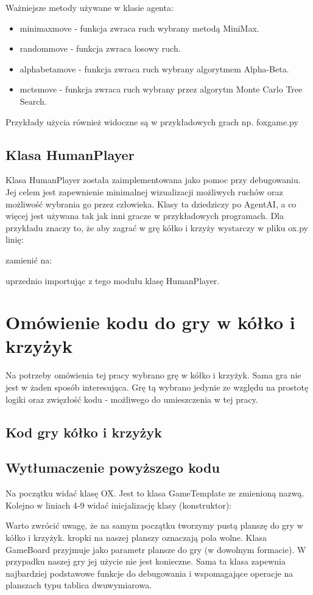 \documentclass[polish,shortabstract,inz]{iithesis}
\begin{document}
Ważniejsze metody używane w klasie agenta:
\begin{itemize}
  \item minimax\textunderscore move - funkcja zwraca ruch wybrany metodą MiniMax.
  \item random\textunderscore move - funkcja zwraca losowy ruch.
  \item alpha\textunderscore beta\textunderscore move - funkcja zwraca ruch wybrany algorytmem Alpha-Beta.
  \item mcts\textunderscore move - funkcja zwraca ruch wybrany przez algorytm Monte Carlo Tree Search.
\end{itemize}
Przykłady użycia również widoczne są w przykładowych grach np. fox\textunderscore game.py

\subsection{Klasa HumanPlayer}
Klasa HumanPlayer została zaimplementowana jako pomoc przy debugowaniu.
Jej celem jest zapewnienie minimalnej wizualizacji możliwych ruchów oraz możliwość wybrania go przez człowieka.
Klasy ta dziedziczy po AgentAI, a co więcej jest używana tak jak inni gracze w przykładowych programach.
Dla przykładu znaczy to, że aby zagrać w grę kółko i krzyży wystarczy w pliku ox.py linię:

zamienić na:

uprzednio importując z tego modułu klasę HumanPlayer.

\section{Omówienie kodu do gry w kółko i krzyżyk}
Na potrzeby omówienia tej pracy wybrano grę w kółko i krzyżyk.
Sama gra nie jest w żaden sposób interesująca.
Grę tą wybrano jedynie ze względu na prostotę logiki oraz zwięzłość kodu - możliwego do umieszczenia w tej pracy.
\subsection{Kod gry kółko i krzyżyk}

\subsection{Wytłumaczenie powyższego kodu}
Na początku widać klasę OX. Jest to klasa GameTemplate ze zmienioną nazwą.
Kolejno w liniach 4-9 widać inicjalizację klasy (konstruktor):

Warto zwrócić uwagę, że na samym początku tworzymy pustą planszę do gry w kółko i krzyżyk.
kropki na naszej planszy oznaczają pola wolne.
Klasa GameBoard przyjmuje jako parametr plansze do gry (w dowolnym formacie).
W przypadku naszej gry jej użycie nie jest konieczne.
Sama ta klasa zapewnia najbardziej podstawowe funkcje do debugowania i wspomagające operacje na planszach typu tablica dwuwymiarowa.
\end{document}
